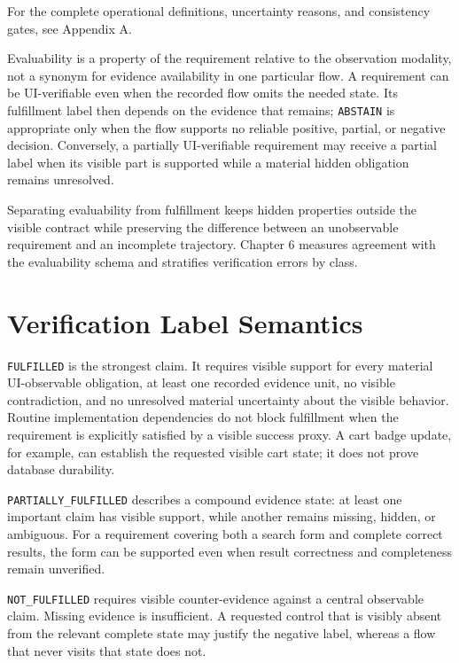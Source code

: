 For the complete operational definitions, uncertainty reasons, and consistency
gates, see Appendix A.

Evaluability is a property of the requirement relative to the observation
modality, not a synonym for evidence availability in one particular flow. A
requirement can be UI-verifiable even when the recorded flow omits the needed
state. Its fulfillment label then depends on the evidence that remains;
\texttt{ABSTAIN} is appropriate only when the flow supports no reliable positive,
partial, or negative decision. Conversely, a partially UI-verifiable
requirement may receive a partial label when its visible part is supported
while a material hidden obligation remains unresolved.

Separating evaluability from fulfillment keeps hidden properties outside the
visible contract while preserving the difference between an unobservable
requirement and an incomplete trajectory. Chapter 6 measures agreement with the
evaluability schema and stratifies verification errors by class.

\section{Verification Label Semantics}\label{verification-label-semantics}

\texttt{FULFILLED} is the strongest claim. It requires visible support for every
material UI-observable obligation, at least one recorded evidence unit, no
visible contradiction, and no unresolved material uncertainty about the
visible behavior. Routine implementation dependencies do not block fulfillment
when the requirement is explicitly satisfied by a visible success proxy. A
cart badge update, for example, can establish the requested visible cart state;
it does not prove database durability.

\texttt{PARTIALLY\_\allowbreak FULFILLED} describes a compound evidence state: at least one
important claim has visible support, while another remains missing, hidden, or
ambiguous. For a requirement covering both a search form and complete correct
results, the form can be supported even when result correctness and
completeness remain unverified.

\texttt{NOT\_FULFILLED} requires visible counter-evidence against a central observable
claim. Missing evidence is insufficient. A requested control that is visibly
absent from the relevant complete state may justify the negative label, whereas
a flow that never visits that state does not.


